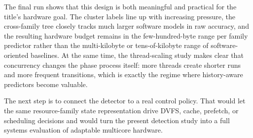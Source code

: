 \documentclass[10pt,twocolumn]{article}
\begin{document}
The final run shows that this design is both meaningful and practical for the title's hardware goal.
The cluster labels line up with increasing pressure, the cross-family tree closely tracks much larger software models in raw accuracy, and the resulting hardware budget remains in the few-hundred-byte range per family predictor rather than the multi-kilobyte or tens-of-kilobyte range of software-oriented baselines.
At the same time, the thread-scaling study makes clear that concurrency changes the phase process itself: more threads create shorter runs and more frequent transitions, which is exactly the regime where history-aware predictors become valuable.

The next step is to connect the detector to a real control policy.
That would let the same resource-family state representation drive DVFS, cache, prefetch, or scheduling decisions and would turn the present detection study into a full systems evaluation of adaptable multicore hardware.

\begingroup
\small


\endgroup
\end{document}
